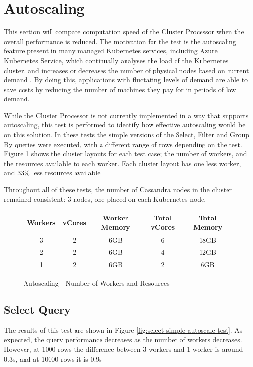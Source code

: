 \section{Autoscaling}
This section will compare computation speed of the Cluster Processor when the overall performance is reduced. The motivation for the test is the autoscaling feature present in many managed Kubernetes services, including Azure Kubernetes Service, which continually analyses the load of the Kubernetes cluster, and increases or decreases the number of physical nodes based on current demand \cite{aksautoscaling}. By doing this, applications with fluctating levels of demand are able to save costs by reducing the number of machines they pay for in periods of low demand.

While the Cluster Processor is not currently implemented in a way that supports autoscaling, this test is performed to identify how effective autoscaling would be on this solution. In these tests the simple versions of the Select, Filter and Group By queries were executed, with a different range of rows depending on the test. Figure \ref{fig:autoscale-test-workers} shows the cluster layouts for each test case; the number of workers, and the resources available to each worker. Each cluster layout has one less worker, and 33\% less resources available.

Throughout all of these tests, the number of Cassandra nodes in the cluster remained consistent: 3 nodes, one placed on each Kubernetes node.

\begin{figure}[ht]
	\centering
	\begin{tabular}{| c | c | c | c | c |}
		\hline
		\textbf{Workers} & \textbf{vCores} & \textbf{Worker Memory} & \textbf{Total vCores} & \textbf{Total Memory} \\ \hline
		3 & 2 & 6GB & 6 & 18GB \\ \hline
		2 & 2 & 6GB & 4 & 12GB \\ \hline
		1 & 2 & 6GB & 2 & 6GB \\ \hline
	\end{tabular}
	\caption{Autoscaling - Number of Workers and Resources}
	\label{fig:autoscale-test-workers}
\end{figure}

\subsection{Select Query}
The results of this test are shown in Figure \ref{fig:select-simple-autoscale-test}. As expected, the query performance decreases as the number of workers decreases. However, at 1000 rows the difference between 3 workers and 1 worker is around 0.3s, and at 10000 rows it is 0.9s

